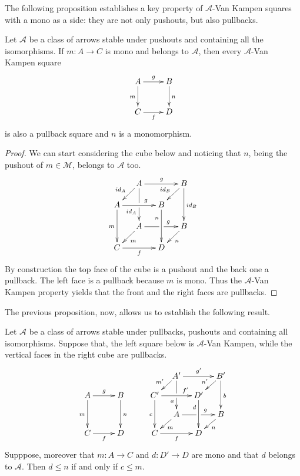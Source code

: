 \documentclass[a4paper,UKenglish,cleveref,pdftex, thm-restate,numberwithinsect]{lipics}
\newcommand{\id}[1]{\mathsf{id}_{#1}}
\def\C{\textbf {\textup{C}}}
\begin{document}
The following proposition establishes a key property of $\mathcal{A}$-Van Kampen squares with a mono as a side: they are not only pushouts, but also pullbacks.

\begin{proposition}\label{prop:pbpo} Let $\mathcal{A}$ be a class of arrows stable under pushouts and containing all the isomorphisms.  If $m\colon A\to C$ is mono and belongs to $\mathcal{A}$, then every $\mathcal{A}$-Van Kampen square
	\[\xymatrix{A\ar[r]^{g} \ar[d]_{m} & B \ar[d]^{n} \\ C \ar[r]_{f}  & D}\]
	is also a pullback square and $n$ is a monomorphism.
\end{proposition}

\begin{proof}
	We can start considering the cube below and noticing that $n$, being the pushout of $m\in \mathcal{M}$, belongs to $\mathcal{A}$ too.
	\[\xymatrix@C=13pt@R=13pt{&A\ar[dd]|\hole_(.65){\id{A}}\ar[rr]^{g} \ar[dl]_{\id{A}} && B \ar[dd]^{\id{B}} \ar[dl]_{\id{B}} \\ A  \ar[dd]_{m}\ar[rr]^(.65){g} & & B \ar[dd]_(.3){n}\\&A\ar[rr]|\hole^(.65){g} \ar[dl]^{m} && B \ar[dl]^{n} \\C \ar[rr]_{f} & & D}\]
	By construction the top face of the cube is a pushout and the back one a pullback. The left face is a pullback because $m$ is mono. Thus the $\mathcal{A}$-Van Kampen property yields that the front and the right faces are pullbacks. 
\end{proof}

The previous proposition, now, allows us to establish the following result.
\begin{lemma}\label{lem:varie}Let $\mathcal{A}$ be a class of arrows stable under pullbacks, pushouts and containing all isomorphisms.  Suppose that, the left square below is $\mathcal{A}$-Van Kampen, while the vertical faces in the right cube are pullbacks.
	\[\xymatrix@C=10pt@R=10pt{&&&&&A'\ar[dd]|\hole_(.65){a}\ar[rr]^{g'} \ar[dl]_{m'} && B' \ar[dd]^{b} \ar[dl]_{n'} \\ A \ar[dd]_{m}\ar[rr]^{g}&&B\ar[dd]^{n}&&C'  \ar[dd]_{c}\ar[rr]^(.7){f'} & & D' \ar[dd]_(.3){d}\\&&&&&A\ar[rr]|\hole^(.65){g} \ar[dl]^{m} && B \ar[dl]^{n} \\C\ar[rr]_{f} &&D&&C \ar[rr]_{f} & & D}\]
	Supppose, moreover that $m\colon A\to C$ and $d\colon D'\to D$ are mono and that $d$ belongs to $\mathcal{A}$. Then $d\leq n$ if and only if $c \leq m$.
\end{lemma}
\end{document}

